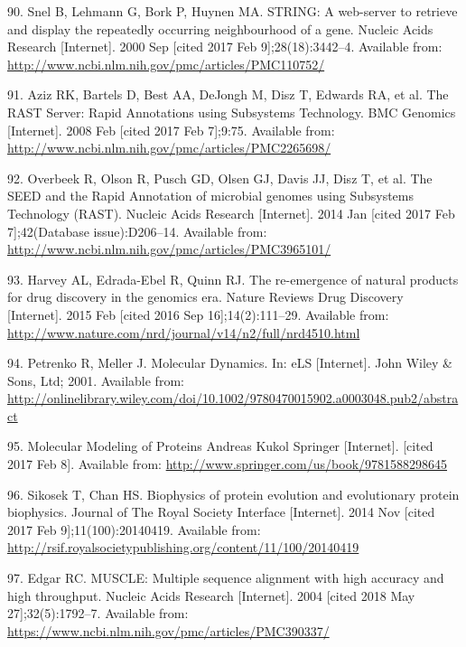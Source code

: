 \documentclass[12pt,twoside]{reedthesis}
\begin{document}
  \hypertarget{ref-snel_string_2000}{}
  90. Snel B, Lehmann G, Bork P, Huynen MA. STRING: A web-server to
  retrieve and display the repeatedly occurring neighbourhood of a gene.
  Nucleic Acids Research {[}Internet{]}. 2000 Sep {[}cited 2017 Feb
  9{]};28(18):3442--4. Available from:
  \url{http://www.ncbi.nlm.nih.gov/pmc/articles/PMC110752/}
  
  \hypertarget{ref-aziz_rast_2008}{}
  91. Aziz RK, Bartels D, Best AA, DeJongh M, Disz T, Edwards RA, et al.
  The RAST Server: Rapid Annotations using Subsystems Technology. BMC
  Genomics {[}Internet{]}. 2008 Feb {[}cited 2017 Feb 7{]};9:75. Available
  from: \url{http://www.ncbi.nlm.nih.gov/pmc/articles/PMC2265698/}
  
  \hypertarget{ref-overbeek_seed_2014}{}
  92. Overbeek R, Olson R, Pusch GD, Olsen GJ, Davis JJ, Disz T, et al.
  The SEED and the Rapid Annotation of microbial genomes using Subsystems
  Technology (RAST). Nucleic Acids Research {[}Internet{]}. 2014 Jan
  {[}cited 2017 Feb 7{]};42(Database issue):D206--14. Available from:
  \url{http://www.ncbi.nlm.nih.gov/pmc/articles/PMC3965101/}
  
  \hypertarget{ref-harvey_re-emergence_2015}{}
  93. Harvey AL, Edrada-Ebel R, Quinn RJ. The re-emergence of natural
  products for drug discovery in the genomics era. Nature Reviews Drug
  Discovery {[}Internet{]}. 2015 Feb {[}cited 2016 Sep
  16{]};14(2):111--29. Available from:
  \url{http://www.nature.com/nrd/journal/v14/n2/full/nrd4510.html}
  
  \hypertarget{ref-petrenko_molecular_2001}{}
  94. Petrenko R, Meller J. Molecular Dynamics. In: eLS {[}Internet{]}.
  John Wiley \& Sons, Ltd; 2001. Available from:
  \url{http://onlinelibrary.wiley.com/doi/10.1002/9780470015902.a0003048.pub2/abstract}
  
  \hypertarget{ref-kukol_molecular_2008}{}
  95. Molecular Modeling of Proteins Andreas Kukol Springer
  {[}Internet{]}. {[}cited 2017 Feb 8{]}. Available from:
  \url{http://www.springer.com/us/book/9781588298645}
  
  \hypertarget{ref-sikosek_biophysics_2014}{}
  96. Sikosek T, Chan HS. Biophysics of protein evolution and evolutionary
  protein biophysics. Journal of The Royal Society Interface
  {[}Internet{]}. 2014 Nov {[}cited 2017 Feb 9{]};11(100):20140419.
  Available from:
  \url{http://rsif.royalsocietypublishing.org/content/11/100/20140419}
  
  \hypertarget{ref-edgar_muscle_2004}{}
  97. Edgar RC. MUSCLE: Multiple sequence alignment with high accuracy and
  high throughput. Nucleic Acids Research {[}Internet{]}. 2004 {[}cited
  2018 May 27{]};32(5):1792--7. Available from:
  \url{https://www.ncbi.nlm.nih.gov/pmc/articles/PMC390337/}
  
\end{document}

